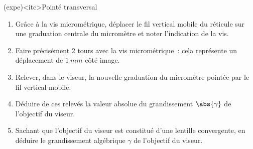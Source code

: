 \documentclass[../main/main.tex]{subfiles}
\begin{document}
{	\begin{tcb}(expe)<itc>{Pointé transversal}
		\begin{enumerate}
			\item Grâce à la vis micrométrique, déplacer le fil vertical mobile du
			      réticule sur une graduation centrale du micromètre et noter
			      l'indication de la vis.
			\item Faire précisément 2 tours avec la vis micrométrique~: cela représente
			      un déplacement de $\SI{1}{mm}$ côté image.
			\item Relever, dans le viseur, la nouvelle graduation du micromètre pointée
			      par le fil vertical mobile.
			\item Déduire de ces relevés la valeur absolue du grandissement
			      $\abs{\gamma}$ de l'objectif du viseur.
			\item Sachant que l'objectif du viseur est constitué d'une lentille
			      convergente, en déduire le grandissement algébrique $\gamma$ de
			      l'objectif du viseur.
		\end{enumerate}
	\end{tcb}
}

\setcounter{subsection}{4}
\end{document}
